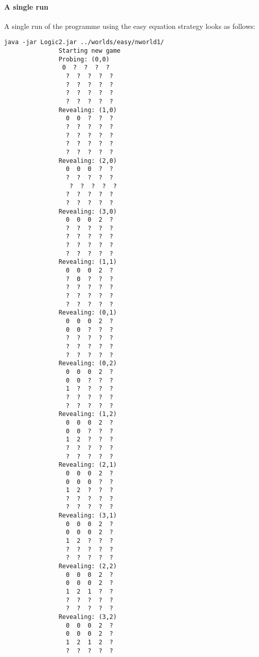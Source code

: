 \documentclass[british]{article}
\begin{document}
\paragraph{A single run} A single run of the programme using the easy equation strategy looks as follows:
\begin{lstlisting}
java -jar Logic2.jar ../worlds/easy/nworld1/
               Starting new game
               Probing: (0,0)
                0  ?  ?  ?  ?
                 ?  ?  ?  ?  ?
                 ?  ?  ?  ?  ?
                 ?  ?  ?  ?  ?
                 ?  ?  ?  ?  ?
               Revealing: (1,0)
                 0  0  ?  ?  ?
                 ?  ?  ?  ?  ?
                 ?  ?  ?  ?  ?
                 ?  ?  ?  ?  ?
                 ?  ?  ?  ?  ?
               Revealing: (2,0)
                 0  0  0  ?  ?
                 ?  ?  ?  ?  ?
                  ?  ?  ?  ?  ?
                 ?  ?  ?  ?  ?
                 ?  ?  ?  ?  ?
               Revealing: (3,0)
                 0  0  0  2  ?
                 ?  ?  ?  ?  ?
                 ?  ?  ?  ?  ?
                 ?  ?  ?  ?  ?
                 ?  ?  ?  ?  ?
               Revealing: (1,1)
                 0  0  0  2  ?
                 ?  0  ?  ?  ?
                 ?  ?  ?  ?  ?
                 ?  ?  ?  ?  ?
                 ?  ?  ?  ?  ?
               Revealing: (0,1)
                 0  0  0  2  ?
                 0  0  ?  ?  ?
                 ?  ?  ?  ?  ?
                 ?  ?  ?  ?  ?
                 ?  ?  ?  ?  ?
               Revealing: (0,2)
                 0  0  0  2  ?
                 0  0  ?  ?  ?
                 1  ?  ?  ?  ?
                 ?  ?  ?  ?  ?
                 ?  ?  ?  ?  ?
               Revealing: (1,2)
                 0  0  0  2  ?
                 0  0  ?  ?  ?
                 1  2  ?  ?  ?
                 ?  ?  ?  ?  ?
                 ?  ?  ?  ?  ?
               Revealing: (2,1)
                 0  0  0  2  ?
                 0  0  0  ?  ?
                 1  2  ?  ?  ?
                 ?  ?  ?  ?  ?
                 ?  ?  ?  ?  ?
               Revealing: (3,1)
                 0  0  0  2  ?
                 0  0  0  2  ?
                 1  2  ?  ?  ?
                 ?  ?  ?  ?  ?
                 ?  ?  ?  ?  ?
               Revealing: (2,2)
                 0  0  0  2  ?
                 0  0  0  2  ?
                 1  2  1  ?  ?
                 ?  ?  ?  ?  ?
                 ?  ?  ?  ?  ?
               Revealing: (3,2)
                 0  0  0  2  ?
                 0  0  0  2  ?
                 1  2  1  2  ?
                 ?  ?  ?  ?  ?

\end{lstlisting}
\end{document}
